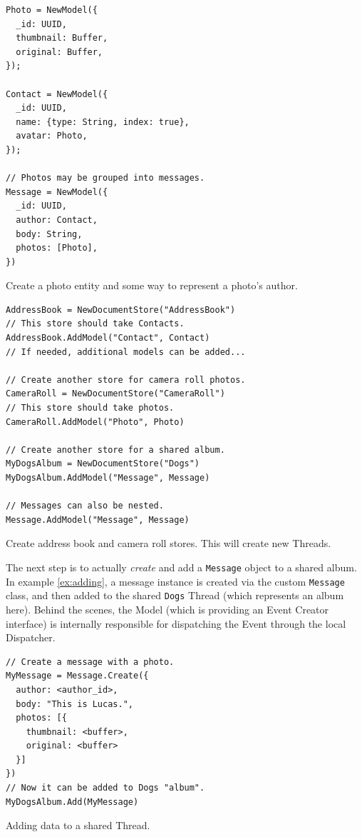 \documentclass{textile}
\begin{document}
\begin{example}
  \begin{minipage}{.45\textwidth}
    \begin{lstlisting}
Photo = NewModel({
  _id: UUID,
  thumbnail: Buffer,
  original: Buffer,
});

Contact = NewModel({
  _id: UUID,
  name: {type: String, index: true},
  avatar: Photo,
});

// Photos may be grouped into messages.
Message = NewModel({
  _id: UUID,
  author: Contact,
  body: String,
  photos: [Photo],
})
    \end{lstlisting}
  \end{minipage}
  \caption{Create a photo entity and some way to represent a photo's author.}
  \label{ex:models}
\end{example}

\begin{example}
  \begin{minipage}{.45\textwidth}
    \begin{lstlisting}
AddressBook = NewDocumentStore("AddressBook")
// This store should take Contacts.
AddressBook.AddModel("Contact", Contact)
// If needed, additional models can be added...

// Create another store for camera roll photos.
CameraRoll = NewDocumentStore("CameraRoll")
// This store should take photos.
CameraRoll.AddModel("Photo", Photo)

// Create another store for a shared album.
MyDogsAlbum = NewDocumentStore("Dogs")
MyDogsAlbum.AddModel("Message", Message)

// Messages can also be nested.
Message.AddModel("Message", Message)
    \end{lstlisting}
  \end{minipage}
  \caption{Create address book and camera roll stores. This will create new Threads.}
  \label{ex:stores}
\end{example}

The next step is to actually \emph{create} and add a \texttt{Message} object to a shared album. In example \ref{ex:adding}, a message instance is created via the custom \texttt{Message} class, and then added to the shared \texttt{Dogs} Thread (which represents an album here). Behind the scenes, the Model (which is providing an Event Creator interface) is internally responsible for dispatching the Event through the local Dispatcher.

\begin{example}
  \begin{minipage}{.45\textwidth}
    \begin{lstlisting}
// Create a message with a photo.
MyMessage = Message.Create({
  author: <author_id>,
  body: "This is Lucas.",
  photos: [{
    thumbnail: <buffer>,
    original: <buffer>
  }]
})
// Now it can be added to Dogs "album".
MyDogsAlbum.Add(MyMessage)
    \end{lstlisting}
  \end{minipage}
  \caption{Adding data to a shared Thread.}
  \label{ex:adding}
\end{example}
\end{document}
